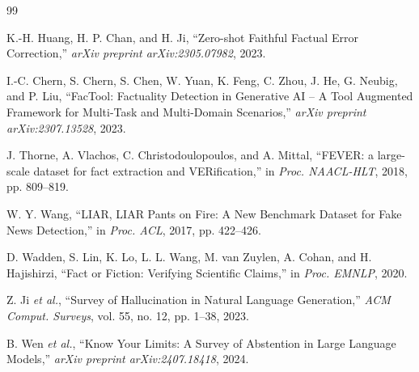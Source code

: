 \documentclass[conference]{IEEEtran}
\begin{document}
\begin{thebibliography}{99}

K.-H. Huang, H. P. Chan, and H. Ji, ``Zero-shot Faithful Factual Error Correction,'' \emph{arXiv preprint arXiv:2305.07982}, 2023.

I.-C. Chern, S. Chern, S. Chen, W. Yuan, K. Feng, C. Zhou, J. He, G. Neubig, and P. Liu, ``FacTool: Factuality Detection in Generative AI -- A Tool Augmented Framework for Multi-Task and Multi-Domain Scenarios,'' \emph{arXiv preprint arXiv:2307.13528}, 2023.

J. Thorne, A. Vlachos, C. Christodoulopoulos, and A. Mittal, ``FEVER: a large-scale dataset for fact extraction and VERification,'' in \emph{Proc. NAACL-HLT}, 2018, pp. 809--819.

W. Y. Wang, ``LIAR, LIAR Pants on Fire: A New Benchmark Dataset for Fake News Detection,'' in \emph{Proc. ACL}, 2017, pp. 422--426.

D. Wadden, S. Lin, K. Lo, L. L. Wang, M. van Zuylen, A. Cohan, and H. Hajishirzi, ``Fact or Fiction: Verifying Scientific Claims,'' in \emph{Proc. EMNLP}, 2020.

Z. Ji \emph{et al.}, ``Survey of Hallucination in Natural Language Generation,'' \emph{ACM Comput. Surveys}, vol. 55, no. 12, pp. 1--38, 2023.

B. Wen \emph{et al.}, ``Know Your Limits: A Survey of Abstention in Large Language Models,'' \emph{arXiv preprint arXiv:2407.18418}, 2024.

\end{thebibliography}
\end{document}
